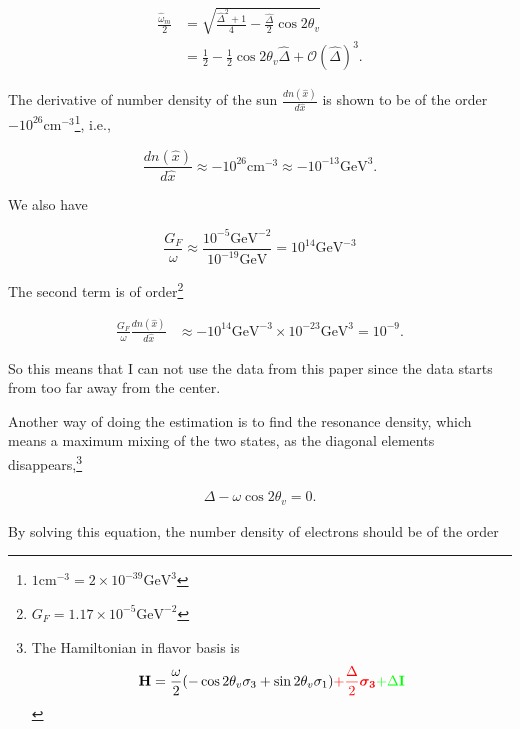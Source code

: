 \documentclass{tufte-handout}
\begin{document}
\begin{align*}
\frac{\hat \omega_m}{2} & = \sqrt{\frac{\hat\Delta ^2 + 1}{4} - \frac{\hat\Delta}{2}\cos 2\theta_v } \\
& = \frac{1}{2} - \frac{1}{2}\cos 2\theta_v \hat\Delta + \mathcal{O}(\hat\Delta)^3.
\end{align*}




The derivative of number density of the sun $\frac{d n(\hat x)}{d\hat x}$ is shown to be of the order $-10^{26} \mathrm{cm^{-3}}$\footnote{$1\mathrm{cm^{-3}} = 2\times 10^{-39}\mathrm{GeV^3} $ }, i.e.,

\begin{equation*}
\frac{d n(\hat x)}{d\hat x} \approx -10^{26} \mathrm{cm^{-3}} \approx -10^{-13} \mathrm{GeV^3}.
\end{equation*}

We also have

\begin{equation*}
\frac{G_F}{\omega} \approx \frac{10^{-5}\mathrm{GeV^{-2}}}{10^{-19}\mathrm{GeV}} = 10^{14} \mathrm{GeV^{-3}}
\end{equation*}


The second term is of order\footnote{$G_F=1.17\times 10^{-5}\mathrm{GeV^{-2}}$}

\begin{align*}
\frac{G_F}{\omega} \frac{d n(\hat x)}{d\hat x} & \approx - 10^{14}\mathrm{GeV^{-3}} \times 10^{-23} \mathrm{GeV^3} = 10^{-9}. 
\end{align*}


So this means that I can not use the data from this paper since the data starts from too far away from the center.

Another way of doing the estimation is to find the resonance density, which means a maximum mixing of the two states, as the diagonal elements disappears,\footnote{
The Hamiltonian in flavor basis is
\begin{align*}
\mathbf H = \frac{\omega}{2} ( -\cos2\theta_v \sigma_3 + \sin 2\theta_v \sigma_1 )   {\color{red} + \frac{\Delta}{2} \boldsymbol{\sigma_3}}  {\color{green}+ \Delta \mathbf I}
\end{align*}
}

\begin{align*}
\Delta - \omega \cos 2\theta_v = 0.
\end{align*}

By solving this equation, the number density of electrons should be of the order
\end{document}
